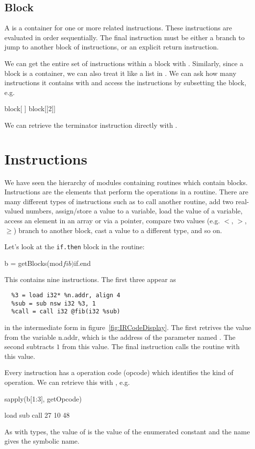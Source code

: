\documentclass[article]{jss}
\begin{document}
\subsection{Block}
A  is a container for one or more related instructions.
These instructions are evaluated in order sequentially.  The final
instruction must be either a branch to jump to another block of
instructions, or an explicit return instruction.

We can get the entire set of instructions within  a block
with .
Similarly, since a block is a container, we can also treat it like a list in \R.  We
can ask how many instructions it contains with  and
access the instructions by subsetting the block, e.g.
\begin{RCode}
 block[ ]  
 block[[2]]
\end{RCode}

We can retrieve the terminator instruction directly with
.

\section{Instructions}
We have seen the hierarchy of modules containing routines which
contain blocks.  Instructions are the elements that perform the
operations in a routine.  There are many different types of
instructions such as to call another routine,
add two real-valued numbers, assign/store
a value to a variable, load the value of a variable,
access an element in an array or via a pointer,
compare two values (e.g. $<$, $>$, $\ge$)
branch to another block, cast a value to a different type, and so on.

Let's look at the \texttt{if.then} block in the
 routine:
\begin{RCode}
b = getBlocks(mod$fib)$if.end
\end{RCode}
This contains nine instructions.
The first three appear as 
\begin{Verbatim}
  %3 = load i32* %n.addr, align 4
  %sub = sub nsw i32 %3, 1
  %call = call i32 @fib(i32 %sub)  
\end{Verbatim}
in the intermediate form in figure~\ref{fig:IRCodeDisplay}.
The first retrives the value from the variable n.addr, which 
is the address of the parameter named .
The second subtracts $1$ from this value.
The final instruction calls the  routine with this value.

Every instruction has a operation code (opcode) which identifies
the kind of operation. We can retrieve this with ,
e.g.
\begin{RCode}
sapply(b[1:3], getOpcode)
\end{RCode}
\begin{ROutput}
load  sub call 
  27   10   48   
\end{ROutput}
As with types, the value of  is the value of the
\C{} enumerated constant and the name gives the symbolic name.
\end{document}

